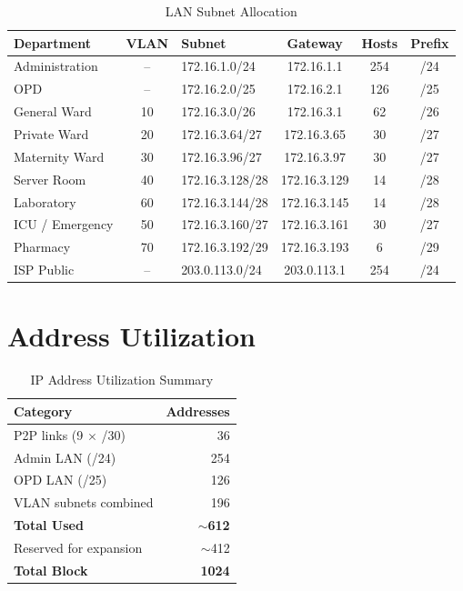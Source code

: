 \documentclass[12pt,a4paper]{report}
\begin{document}
\begin{table}[H]
\centering
\caption{LAN Subnet Allocation}
\label{tab:lan}
\begin{tabular}{lclccc}
\toprule
\textbf{Department} & \textbf{VLAN} & \textbf{Subnet} & \textbf{Gateway} & \textbf{Hosts} & \textbf{Prefix} \\
\midrule
Administration & -- & 172.16.1.0/24 & 172.16.1.1 & 254 & /24 \\
OPD & -- & 172.16.2.0/25 & 172.16.2.1 & 126 & /25 \\
General Ward & 10 & 172.16.3.0/26 & 172.16.3.1 & 62 & /26 \\
Private Ward & 20 & 172.16.3.64/27 & 172.16.3.65 & 30 & /27 \\
Maternity Ward & 30 & 172.16.3.96/27 & 172.16.3.97 & 30 & /27 \\
Server Room & 40 & 172.16.3.128/28 & 172.16.3.129 & 14 & /28 \\
Laboratory & 60 & 172.16.3.144/28 & 172.16.3.145 & 14 & /28 \\
ICU / Emergency & 50 & 172.16.3.160/27 & 172.16.3.161 & 30 & /27 \\
Pharmacy & 70 & 172.16.3.192/29 & 172.16.3.193 & 6 & /29 \\
ISP Public & -- & 203.0.113.0/24 & 203.0.113.1 & 254 & /24 \\
\bottomrule
\end{tabular}
\end{table}

\section{Address Utilization}
\begin{table}[H]
\centering
\caption{IP Address Utilization Summary}
\begin{tabular}{lr}
\toprule
\textbf{Category} & \textbf{Addresses} \\
\midrule
P2P links (9 $\times$ /30) & 36 \\
Admin LAN (/24) & 254 \\
OPD LAN (/25) & 126 \\
VLAN subnets combined & 196 \\
\midrule
\textbf{Total Used} & \textbf{$\sim$612} \\
Reserved for expansion & $\sim$412 \\
\textbf{Total Block} & \textbf{1024} \\
\bottomrule
\end{tabular}
\end{table}
\end{document}
